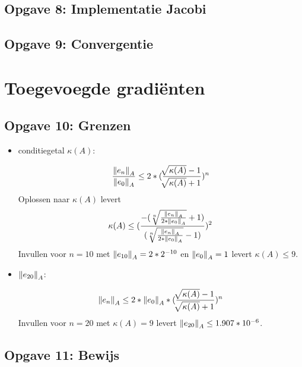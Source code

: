 \documentclass[a4paper]{article}
\newcommand{\opgave}[1]{\subsection{Opgave #1}}
\begin{document}
\opgave{8: Implementatie Jacobi}\label{sec:oef8}

\opgave{9: Convergentie}\label{sec:oef9}

\section{Toegevoegde gradi\"enten}\label{sec:CG}

\opgave{10: Grenzen}\label{sec:oef10}

\begin{itemize}
    	\item conditiegetal \(\kappa(A)\): \par\noindent
        \[\frac{\norm{e_n}_A}{\norm{e_0}_A} \leq 2*(\frac{\sqrt[]{\kappa(A)}-1}{\sqrt[]					{\kappa(A)}+1})^n\]
        Oplossen naar \(\kappa(A)\) levert
        \[\kappa(A) \leq (\frac{-(\sqrt[n]{\frac{\norm{e_n}_A}{2*\norm{e_0}_A}}+1)}						{(\sqrt[n]{\frac{\norm{e_n}_A}{2*\norm{e_0}_A}}-1)})^2\]
        Invullen voor \(n = 10\) met \(\norm{e_{10}}_A = 2*2^{-10}\) en \(\norm{e_0}_A = 1\) 			levert \(\kappa(A) \leq 9\).
        
        \item \(\norm{e_{20}}_A\): \par\noindent
        \[\norm{e_n}_A \leq 2*\norm{e_0}_A*(\frac{\sqrt[]{\kappa(A)}-1}{\sqrt[]							{\kappa(A)}+1})^n\]
        Invullen voor \(n = 20\) met \(\kappa(A) = 9\) levert \(\norm{e_{20}}_A \leq 					1.907*10^{-6}\).
	\end{itemize}

\opgave{11: Bewijs}\label{sec:oef11}
\end{document}
